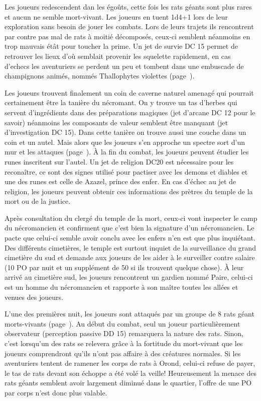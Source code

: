 Les joueurs redescendent dan les égoûts, cette fois les rats géants sont plus rares et aucun ne semble 
mort-vivant. Les joueurs en tuent 1d4+1 lors de leur exploration sans besoin de jouer les combats. Lors de
leurs trajets ils rencontrent par contre pas mal de rats à moitié décomposés, ceux-ci semblent néanmoins
en trop mauvais étât pour toucher la prime. Un jet de survie DC 15 permet de retrouver les lieux d'où 
semblait provenir les squelette rapidement, en cas d'echecs les aventuriers se perdent un peu et tombent 
dans une embuscade de champignons animés, nommés Thallophytes violettes (page~\pageref{ThallophyteViolette}).

Les joueurs trouvent finalement un coin de caverne naturel amenagé qui pourrait certainement être la tanière
du nécromant. On y trouve un tas d'herbes qui servent d'ingrédients dans des préparations magiques (jet 
d'arcane DC 12 pour le savoir) néanmoins les composants de valeur semblent être manquant (jet d'investigation
DC 15). Dans cette tanière on trouve aussi une couche dans un coin et un autel. Mais alors que les joueurs
s'en approche un spectre sort d'un mur et les attaques (page~\pageref{Spectre}). À la fin du combat, 
les joueurs peuvent étudier les runes inscritent sur l'autel.
Un jet de religion DC20 est nécessaire pour les reconaître, ce sont des signes utilisé pour pactiser avec
les demons et diables et une des runes est celle de Azazel, prince des enfer. En cas d'échec au jet de 
religion, 
les joueurs peuvent obtenir ces informations des prètres du temple de la mort ou de la justice.

Après consultation du clergé du temple de la mort, ceux-ci vont inspecter le camp du nécromancien et 
confirment que c'est bien la signature d'un nécromancien. Le pacte que celui-ci semble avoir conclu avec les 
enfers n'en est que plus inquiétant. Des différents cimetières, le temple est surtout inquiet de la 
surveillance du grand cimetière du sud et demande aux joueurs de les aider à le surveiller contre salaire 
(10 PO par nuit et un supplément de 50 si ils trouvent quelque chose). À leur arrivé au cimetière sud,
les joueurs rencontrent un gardien nommé Paire, celui-ci est un homme du nécromancien et rapporte à son 
maître toutes les allées et venues des joueurs.


L'une des premières nuit, les joueurs sont attaqués par un groupe de 8 rats géant morts-vivants 
(page~\pageref{RatGeantMV}). Au début du combat, seul un 
joueur particulièrement observateur (perception passive DD 15) remarquera la nature des rats. Sinon, c'est 
lorsqu'un des rats se relevera grâce à la fortitude du mort-vivant que les joueurs comprendront qu'ils
n'ont pas affaire à des créatures normales. Si les aventuriers tentent de ramener les corps de rats à Orond,
celui-ci refuse de payer, le tas de rats devant son échoppe a été volé la veille! Heureusement la menace
des rats géants semblent avoir largement diminué dans le quartier, l'offre de une PO par corps n'est donc
plus valable.

